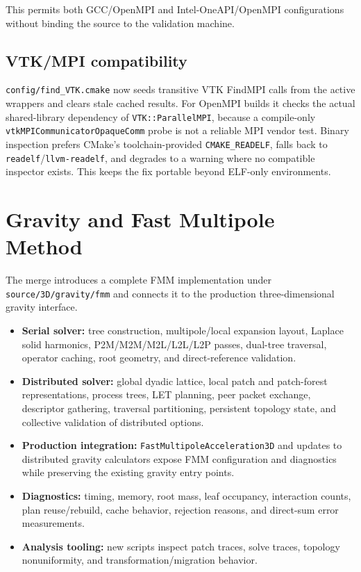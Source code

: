 \documentclass[10pt,a4paper]{article}
\newcommand{\file}[1]{\nolinkurl{#1}}
\begin{document}
This permits both GCC/OpenMPI and Intel-OneAPI/OpenMPI configurations without
binding the source to the validation machine.

\subsection{VTK/MPI compatibility}

\file{config/find_VTK.cmake} now seeds transitive VTK FindMPI calls from the
active wrappers and clears stale cached results.  For OpenMPI builds it checks
the actual shared-library dependency of \file{VTK::ParallelMPI}, because a
compile-only \file{vtkMPICommunicatorOpaqueComm} probe is not a reliable MPI
vendor test.  Binary inspection prefers CMake's toolchain-provided
\file{CMAKE_READELF}, falls back to \file{readelf}/\file{llvm-readelf}, and
degrades to a warning where no compatible inspector exists.  This keeps the
fix portable beyond ELF-only environments.

\section{Gravity and Fast Multipole Method}

The merge introduces a complete FMM implementation under
\file{source/3D/gravity/fmm} and connects it to the production three-dimensional
gravity interface.

\begin{itemize}
  \item \textbf{Serial solver:} tree construction, multipole/local expansion
        layout, Laplace solid harmonics, P2M/M2M/M2L/L2L/L2P passes, dual-tree
        traversal, operator caching, root geometry, and direct-reference
        validation.
  \item \textbf{Distributed solver:} global dyadic lattice, local patch and
        patch-forest representations, process trees, LET planning, peer packet
        exchange, descriptor gathering, traversal partitioning, persistent
        topology state, and collective validation of distributed options.
  \item \textbf{Production integration:}
        \file{FastMultipoleAcceleration3D} and updates to distributed gravity
        calculators expose FMM configuration and diagnostics while preserving
        the existing gravity entry points.
  \item \textbf{Diagnostics:} timing, memory, root mass, leaf occupancy,
        interaction counts, plan reuse/rebuild, cache behavior, rejection
        reasons, and direct-sum error measurements.
  \item \textbf{Analysis tooling:} new scripts inspect patch traces, solve
        traces, topology nonuniformity, and transformation/migration behavior.
\end{itemize}
\end{document}
